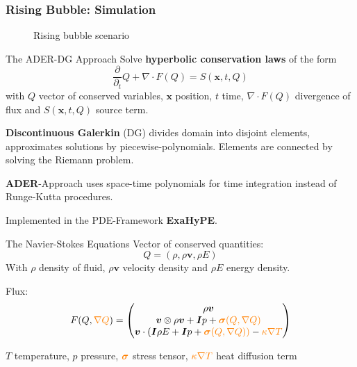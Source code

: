 \documentclass{beamer}
\newcommand{\Qrho}{\ensuremath{\rho}}
\newcommand{\Qj}{\ensuremath{\rho \bm{v}}}
\newcommand{\Qv}{\ensuremath{\bm{v}}}
\newcommand{\QE}{\ensuremath{\rho E}}
\newcommand{\stressT}{\ensuremath{\bm{\sigma}}}
\newcommand{\pressure}{\ensuremath{p}}
\begin{document}
\begin{frame}
  \frametitle{Rising Bubble: Simulation}
   \begin{figure}[h]
    \centering
    \caption{Rising bubble scenario}
  \end{figure}
\end{frame}

\begin{frame}{The ADER-DG Approach}
  Solve \textbf{hyperbolic conservation laws} of the form
\begin{equation}
  \label{eq:conservation-law}
 \frac{\partial}{\partial_t}  Q + \nabla \cdot F(Q) = S(\bm{x}, t, Q)
\end{equation}
with $Q$ vector of conserved variables, $\bm{x}$ position, $t$ time,  $\nabla \cdot F(Q)$ divergence of flux and $S(\bm{x}, t, Q)$ source term.

\textbf{Discontinuous Galerkin} (\textsc{DG}) divides domain into disjoint elements, approximates solutions by piecewise-polynomials.
Elements are connected by solving the Riemann problem.

\textbf{ADER}-Approach uses space-time polynomials for time integration instead of Runge-Kutta procedures.

Implemented in the PDE-Framework \textbf{ExaHyPE}.
\end{frame}

\begin{frame}{The Navier-Stokes Equations}
  Vector of conserved quantities:
\begin{equation}
  \label{eq:conserved-variables}
 Q = \left( \Qrho, \Qj, \QE \right) 
\end{equation}
With $\Qrho$ density of fluid, $\Qj$ velocity density and $\QE$ energy density.

Flux:
\begin{equation}
  F(Q, \textcolor{orange}{\nabla Q}) = 
  \begin{pmatrix}
    \Qj \\
    \Qv  \otimes \Qj + \bm{I} \pressure + \textcolor{orange}{\stressT (Q, \nabla Q)}  \\
    \Qv \cdot (\bm{I} \QE + \bm{I} \pressure + \textcolor{orange}{\stressT (Q, \nabla Q))} -
    \textcolor{orange}{\kappa \nabla T}
  \end{pmatrix}
\end{equation}

$T$ temperature, $\pressure$ pressure,
$\textcolor{orange}{\stressT}$ stress tensor, $\textcolor{orange}{\kappa \nabla T}$ heat diffusion term
\end{frame}
\end{document}

